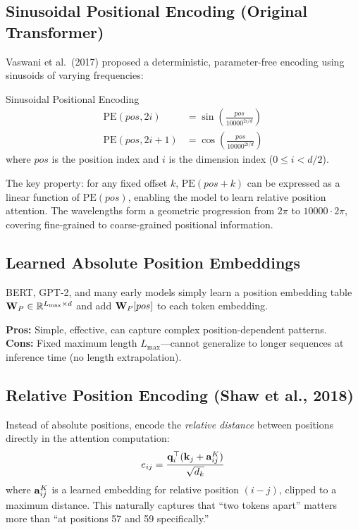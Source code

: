 \subsection{Sinusoidal Positional Encoding (Original Transformer)}

Vaswani et al.\ (2017) proposed a deterministic, parameter-free encoding using
sinusoids of varying frequencies:

\begin{mathresult}{Sinusoidal Positional Encoding}
\begin{align*}
    \text{PE}(pos, 2i) &= \sin\!\left(\frac{pos}{10000^{2i/d}}\right) \\[4pt]
    \text{PE}(pos, 2i+1) &= \cos\!\left(\frac{pos}{10000^{2i/d}}\right)
\end{align*}
where $pos$ is the position index and $i$ is the dimension index
($0 \leq i < d/2$).
\end{mathresult}

The key property: for any fixed offset $k$, $\text{PE}(pos + k)$ can be
expressed as a linear function of $\text{PE}(pos)$, enabling the model to
learn relative position attention.  The wavelengths form a geometric
progression from $2\pi$ to $10000 \cdot 2\pi$, covering fine-grained to
coarse-grained positional information.

\subsection{Learned Absolute Position Embeddings}

BERT, GPT-2, and many early models simply learn a position embedding table
$\mathbf{W}_P \in \mathbb{R}^{L_{\max} \times d}$ and add $\mathbf{W}_P[pos]$ to each token
embedding.

\textbf{Pros:} Simple, effective, can capture complex position-dependent patterns.\\
\textbf{Cons:} Fixed maximum length $L_{\max}$---cannot generalize to longer
sequences at inference time (no length extrapolation).

\subsection{Relative Position Encoding (Shaw et al., 2018)}

Instead of absolute positions, encode the \emph{relative distance} between
positions directly in the attention computation:
\[
    e_{ij} = \frac{\mathbf{q}_i^\top(\mathbf{k}_j + \mathbf{a}_{ij}^K)}{\sqrt{d_k}}
\]
where $\mathbf{a}_{ij}^K$ is a learned embedding for relative position $(i - j)$,
clipped to a maximum distance.  This naturally captures that ``two tokens apart''
matters more than ``at positions 57 and 59 specifically.''

